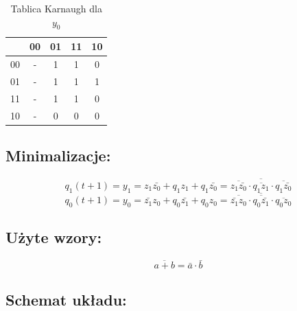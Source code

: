 \documentclass[12pt,a4paper]{article}
\begin{document}
\begin{table}[H]
\begin{minipage}{.5\textwidth}
				\caption{Tablica Karnaugh dla $y_0$}
				\vspace{0.2cm}
				\centering
				\begin{tabular}{c|c|c|c|c}
					\backslashbox{$z_1z_0$}{$q_1q_0$}&00&01&11&10\\\hline
					00	&	-	&	1	&	1	&	0	\\\hline
					01	&	-	&	1	&	1	&	1	\\\hline
					11	&	-	&	1	&	1	&	0	\\\hline
					10	&	-	&	0	&	0	&	0	
				\end{tabular}
			\end{minipage}
			\end{table}
		
		\subsection{Minimalizacje:}
			\begin{displaymath}
			q_1(t+1) = y_1 = z_1\bar{z_0} + q_1z_1 + q_1\bar{z_0}= \overline{\overline{z_1\bar{z_0}} \cdot \overline{q_1z_1} \cdot \overline{q_1\bar{z_0}}}
			\end{displaymath}
			\begin{displaymath}
			q_0(t+1) = y_0 = \bar{z_1}z_0 + q_0\bar{z_1} + q_0z_0= \overline{\overline{\bar{z_1}z_0} \cdot \overline{q_0\bar{z_1}} \cdot \overline{q_0z_0}}
			\end{displaymath}
		
		\newpage
		\subsection{Użyte wzory:}
			\begin{equation}
			\overline{a+b}=\bar{a}\cdot\bar{b}
			\end{equation}
		
		\subsection{Schemat układu:}
		
\end{document}
